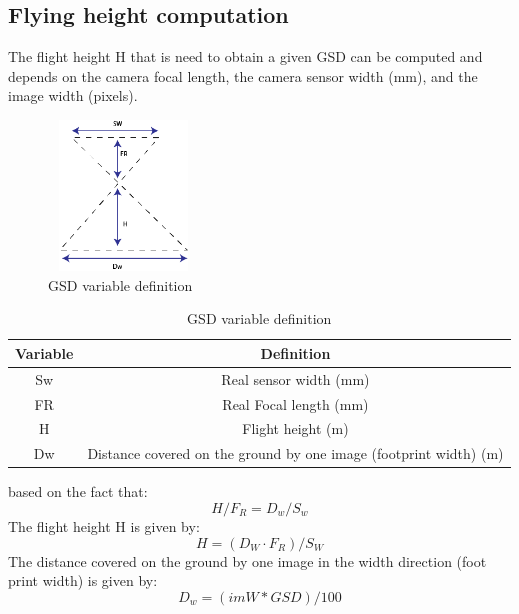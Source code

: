 \subsection{Flying height computation}
The flight height H that is need to obtain a given GSD can be computed and depends on the camera focal length, the camera sensor width  (mm), and the image width (pixels).\cite{GSDComputation}
\begin{figure}[H]
\centering
\includegraphics[width=4cm,height=4cm,keepaspectratio]{imagenes/GSD_Varaible.png}
\caption{GSD variable definition}
\label{fig:GSD}
\end{figure}
\begin{table}[H]
\centering
\begin{tabular}{|c|c|}
\hline
\textbf{Variable} & \textbf{Definition}                                                                      \\ \hline
Sw                & Real sensor width (mm)                                                                   \\ \hline
FR                & Real Focal length (mm)                                                                   \\ \hline
H                 & Flight height (m)                                                                        \\ \hline
Dw                & Distance covered on the ground by one image (footprint width) (m) \\ \hline
\end{tabular}
\caption{GSD variable definition}
\end{table}
based on the fact that:
\begin{equation}
H/F_{R} = D_{w}/S_{w}
\end{equation}
The flight height H is given by:
\begin{equation}
H = (D_{W}\cdot F_{R})/S_{W}
\label{H}
\end{equation}
The distance covered on the ground by one image in the width direction (foot print width) is given by:
\begin{equation}
D_{w}=(imW*GSD)/100
\label{DW}
\end{equation}
